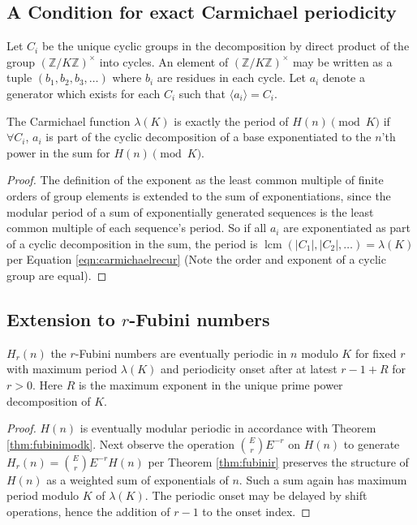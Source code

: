 \documentclass[12pt,reqno]{article}
\DeclareMathOperator{\lcm}{lcm}
\begin{document}
\subsection{A Condition for exact Carmichael periodicity}
Let $C_{i}$ be the unique cyclic groups in the decomposition by direct product of the group $(\mathbb{Z}/K\mathbb{Z})^{\times}$ into cycles. An element of $(\mathbb{Z}/K\mathbb{Z})^{\times}$ may be written as a tuple  $(b_{1}, b_{2}, b_{3}, \ldots)$ where $b_{i}$ are residues in each cycle. Let $a_{i}$ denote a generator which exists for each $C_{i}$ such that $\langle a_{i} \rangle = C_{i}$.
\begin{theorem}
	The Carmichael function $\lambda(K)$ is exactly the period of $H(n) \pmod{K}$ if  \   $\forall C_{i}$, $a_{i}$ is part of the cyclic decomposition of a base exponentiated to the $n$'th power in the sum for $H(n) \pmod{K}$.
\end{theorem}
\begin{proof}
	The definition of the exponent as the least common multiple of finite orders of group elements is extended to the sum of exponentiations, since the modular period of a sum of exponentially generated sequences is the least common multiple of each sequence's period. So if all $a_{i}$ are exponentiated as part of a cyclic decomposition in the sum, the period is $\lcm(|C_{1}|, |C_{2}|, \ldots) = \lambda(K)$ per Equation \ref{eqn:carmichaelrecur} (Note the order and exponent of a cyclic group are equal).
\end{proof}

\subsection{Extension to $r$-Fubini numbers}
\begin{corollary}
	$H_{r}(n)$ the $r$-Fubini numbers are eventually periodic in $n$ modulo $K$ for fixed $r$ with maximum period $\lambda(K)$ and periodicity onset after at latest $r - 1 + R$ for $r > 0$. Here $R$ is the maximum exponent in the unique prime power decomposition of $K$.

	\begin{proof}

		$H(n)$ is eventually modular periodic in accordance with Theorem \ref{thm:fubinimodk}. Next observe the operation $\binom{E}{r} E^{-r}$ on $H(n)$ to generate $H_{r}(n) = \binom{E}{r} E^{-r} H(n)$ per Theorem \ref{thm:fubinir} preserves the structure of $H(n)$ as a weighted sum of exponentials of $n$. Such a sum again has maximum period modulo $K$ of $\lambda(K)$. The periodic onset may be delayed by shift operations, hence the addition of $r - 1$ to the onset index.
	\end{proof}
\end{corollary}
\end{document}
